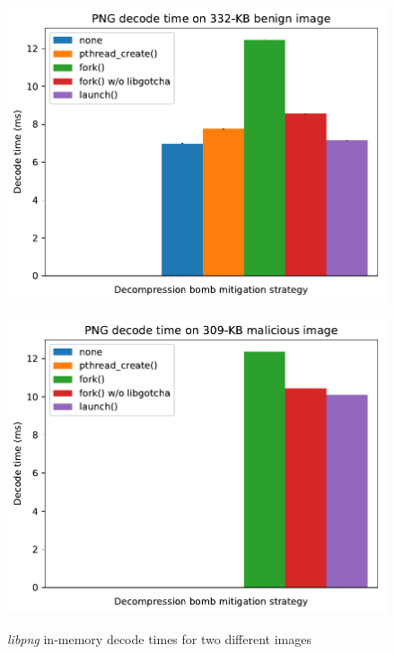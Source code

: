 \begin{figure}
	\begin{minipage}{\columnwidth}
	\includegraphics[width=\textwidth]{figs/cerberus_nns16_surplus256k_mirjam}
	\label{fig:libpng:benign}
	\end{minipage}
%
	\begin{minipage}{\columnwidth}
	\includegraphics[width=\textwidth]{figs/cerberus_nns16_surplus256k_10K}
	\label{fig:libpng:bomb}
	\end{minipage}
\caption{\textit{libpng} in-memory decode times for two different images}
\end{figure}

